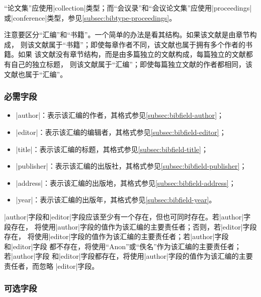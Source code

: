 \begin{note}
“论文集”应使用|collection|类型；而“会议录”和“会议论文集”应使用|proceedings|
或|conference|类型，参见\ref{subsec:bibtype-proceedings}。
\end{note}

\begin{note}
注意要区分“汇编”和“书籍”。一个简单的办法是看其结构。如果该文献是由章节构成，
则该文献属于“书籍”；即使每章作者不同，该文献也属于拥有多个作者的书籍。如果
该文献没有章节结构，而是由多篇独立的文献构成，每篇独立的文献都有自己的独立标题，
则该文献属于“汇编”；即使每篇独立文献的作者都相同，该文献也属于“汇编”。
\end{note}

\subsubsection{必需字段}

\begin{itemize}
\item |author|：表示该汇编的作者，其格式参见\ref{subsec:bibfield-author}；
\item |editor|：表示该汇编的编辑者，其格式参见\ref{subsec:bibfield-editor}；
\item |title|：表示该汇编的标题，其格式参见\ref{subsec:bibfield-title}；
\item |publisher|：表示该汇编的出版社，其格式参见\ref{subsec:bibfield-publisher}；
\item |address|：表示该汇编的出版地，其格式参见\ref{subsec:bibfield-address}；
\item |year|：表示该汇编的出版年，其格式参见\ref{subsec:bibfield-year}。
\end{itemize}

\begin{note}
|author|字段和|editor|字段应该至少有一个存在，但也可同时存在。若|author|字段存在，
{\BibTeX}将使用|author|字段的值作为该汇编的主要责任者；否则，若|editor|字段存在，
{\BibTeX}将使用|editor|字段的值作为该汇编的主要责任者；若|author|字段和|editor|字段
都不存在，{\BibTeX}将使用``Anon''或``佚名''作为该汇编的主要责任者；若|author|字段
和|editor|字段都存在，{\BibTeX}将使用|author|字段的值作为该汇编的主要责任者，而忽略
|editor|字段。
\end{note}

\subsubsection{可选字段}

